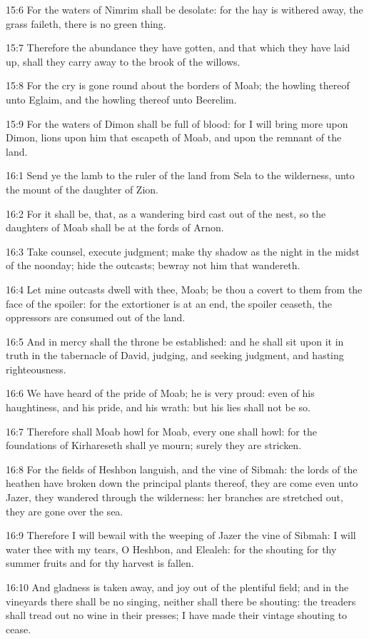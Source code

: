 15:6 For the waters of Nimrim shall be desolate: for the hay is withered away, the grass faileth, there is no green thing.

15:7 Therefore the abundance they have gotten, and that which they have laid up, shall they carry away to the brook of the willows.

15:8 For the cry is gone round about the borders of Moab; the howling thereof unto Eglaim, and the howling thereof unto Beerelim.

15:9 For the waters of Dimon shall be full of blood: for I will bring more upon Dimon, lions upon him that escapeth of Moab, and upon the remnant of the land.

16:1 Send ye the lamb to the ruler of the land from Sela to the wilderness, unto the mount of the daughter of Zion.

16:2 For it shall be, that, as a wandering bird cast out of the nest, so the daughters of Moab shall be at the fords of Arnon.

16:3 Take counsel, execute judgment; make thy shadow as the night in the midst of the noonday; hide the outcasts; bewray not him that wandereth.

16:4 Let mine outcasts dwell with thee, Moab; be thou a covert to them from the face of the spoiler: for the extortioner is at an end, the spoiler ceaseth, the oppressors are consumed out of the land.

16:5 And in mercy shall the throne be established: and he shall sit upon it in truth in the tabernacle of David, judging, and seeking judgment, and hasting righteousness.

16:6 We have heard of the pride of Moab; he is very proud: even of his haughtiness, and his pride, and his wrath: but his lies shall not be so.

16:7 Therefore shall Moab howl for Moab, every one shall howl: for the foundations of Kirhareseth shall ye mourn; surely they are stricken.

16:8 For the fields of Heshbon languish, and the vine of Sibmah: the lords of the heathen have broken down the principal plants thereof, they are come even unto Jazer, they wandered through the wilderness: her branches are stretched out, they are gone over the sea.

16:9 Therefore I will bewail with the weeping of Jazer the vine of Sibmah: I will water thee with my tears, O Heshbon, and Elealeh: for the shouting for thy summer fruits and for thy harvest is fallen.

16:10 And gladness is taken away, and joy out of the plentiful field; and in the vineyards there shall be no singing, neither shall there be shouting: the treaders shall tread out no wine in their presses; I have made their vintage shouting to cease.

